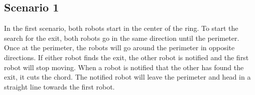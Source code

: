 \documentclass[12pt,letterpaper]{article}
\begin{document}
    \subsection{Scenario 1}
        In the first scenario, both robots start in the center of the ring. To start the search for the exit, both robots go in the same direction until the perimeter. Once at the perimeter, the robots will go around the perimeter in opposite directions. If either robot finds the exit, the other robot is notified and the first robot will stop moving. When a robot is notified that the other has found the exit, it cuts the chord. The notified robot will leave the perimeter and head in a straight line towards the first robot.
        
%         
%         

        \begin{center}
        \end{center}
\end{document}
